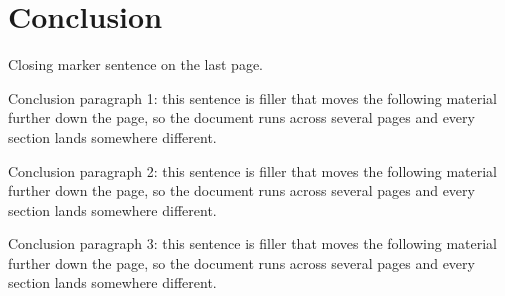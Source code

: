 \documentclass[11pt]{article}
\begin{document}
\section{Conclusion}
Closing marker sentence on the last page.

Conclusion paragraph 1: this sentence is filler that moves the following material further down the page, so the document runs across several pages and every section lands somewhere different.

Conclusion paragraph 2: this sentence is filler that moves the following material further down the page, so the document runs across several pages and every section lands somewhere different.

Conclusion paragraph 3: this sentence is filler that moves the following material further down the page, so the document runs across several pages and every section lands somewhere different.
\end{document}
